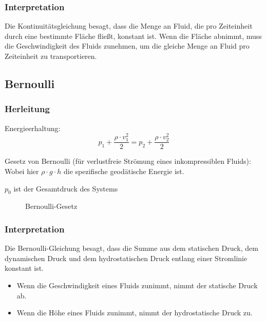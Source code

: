 \documentclass[a4paper,11pt,twoside]{article}
\begin{document}
\subsubsection{Interpretation}
Die Kontinuitätsgleichung besagt, dass die Menge an Fluid, die pro Zeiteinheit durch eine bestimmte Fläche fließt, konstant ist. Wenn die Fläche abnimmt, muss die Geschwindigkeit des Fluids zunehmen, um die gleiche Menge an Fluid pro Zeiteinheit zu transportieren.

\vfill

\pagebreak
\subsection{Bernoulli}
\subsubsection{Herleitung}
Energieerhaltung:
\begin{equation*}
p_1 + \frac{\rho \cdot v_1^2}{2} = p_2 + \frac{\rho \cdot v_2^2}{2}
\end{equation*}


\ppbig
 
 
Gesetz von Bernoulli (für verlustfreie Strömung eines inkompressiblen Fluids):
 \pp Wobei hier $\rho \cdot g \cdot h$ die spezifische geodätische Energie ist. \par  $p_0$ ist der Gesamtdruck des Systems

\begin{figure}[h]
\centering

\caption{Bernoulli-Gesetz}
\end{figure}

\subsubsection{Interpretation}
Die Bernoulli-Gleichung besagt, dass die Summe aus dem statischen Druck, dem dynamischen Druck und dem hydrostatischen Druck entlang einer Stromlinie konstant ist.

\begin{itemize}

\item Wenn die Geschwindigkeit eines Fluids zunimmt, nimmt der statische Druck ab.
\item Wenn die Höhe eines Fluids zunimmt, nimmt der hydrostatische Druck zu.

\end{itemize}
\end{document}
